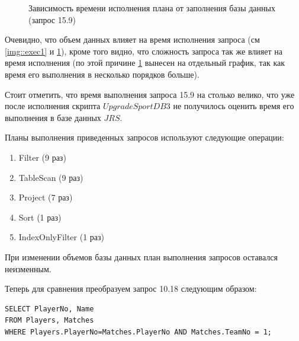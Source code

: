 \documentclass[a4paper,12pt]{article}
\begin{document}
\begin{figure}[h]
	\noindent{}
	\caption{Зависимость времени исполнения плана от заполнения базы данных (запрос 15.9)}
	\label{img::exec2}
\end{figure}

Очевидно, что объем данных влияет на время исполнения запроса (см \ref{img::exec1} и \ref{img::exec2}), кроме того видно,
что сложность запроса так же влияет на время исполнения (по этой причине \ref{img::exec2} вынесен на отдельный график, так
как время его выполнения в несколько порядков больше).

Стоит отметить, что время выполнения запроса 15.9 на столько велико, что уже после исполнения скрипта $UpgradeSportDB3$
не получилось оценить время его выполнения в базе данных $JRS$.

Планы выполнения приведенных запросов используют следующие операции:
\begin{enumerate}
\item Filter (9 раз)

\item TableScan (9 раз)

\item Project (7 раз)

\item Sort (1 раз)

\item IndexOnlyFilter (1 раз)
\end{enumerate}

При изменении объемов базы данных план выполнения запросов оставался неизменным.

Теперь для сравнения преобразуем запрос 10.18 следующим образом:
\begin{lstlisting}
SELECT PlayerNo, Name
FROM Players, Matches
WHERE Players.PlayerNo=Matches.PlayerNo AND Matches.TeamNo = 1;
\end{lstlisting}
\end{document}
